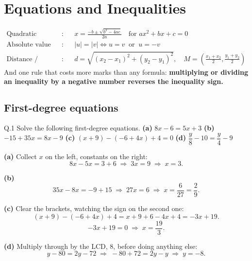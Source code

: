\chapter{Equations and Inequalities}


\begin{keyidea}
\begin{align*}
\text{Quadratic formula}&: && x=\frac{-b\pm\sqrt{b^{2}-4ac}}{2a}
   \quad\text{for } ax^{2}+bx+c=0\\[2pt]
\text{Absolute value}&: && |u|=|v| \iff u=v \ \text{ or } \ u=-v\\[2pt]
\text{Distance / midpoint}&: &&
   d=\sqrt{(x_2-x_1)^{2}+(y_2-y_1)^{2}},\quad
   M=\left(\tfrac{x_1+x_2}{2},\tfrac{y_1+y_2}{2}\right)
\end{align*}
And one rule that costs more marks than any formula: \textbf{multiplying or
dividing an inequality by a negative number reverses the inequality sign.}
\end{keyidea}

\section{First-degree equations}

\begin{question}{Q.1}
Solve the following first-degree equations.
\textbf{(a)} $8x-6=5x+3$ \quad
\textbf{(b)} $-15+35x=8x-9$ \quad
\textbf{(c)} $(x+9)-(-6+4x)+4=0$ \quad
\textbf{(d)} $\dfrac{y}{8}-10=\dfrac{y}{4}-9$
\end{question}

\begin{solution}
\textbf{(a)} Collect $x$ on the left, constants on the right:
\[
8x-5x=3+6 \;\Longrightarrow\; 3x=9 \;\Longrightarrow\; x=3 .
\]

\medskip
\textbf{(b)}
\[
35x-8x=-9+15 \;\Longrightarrow\; 27x=6 \;\Longrightarrow\;
x=\frac{6}{27}=\frac{2}{9}.
\]

\medskip
\textbf{(c)} Clear the brackets, watching the sign on the second one:
\[
(x+9)-(-6+4x)+4 = x+9+6-4x+4 = -3x+19 .
\]
\[
-3x+19=0 \;\Longrightarrow\; x=\frac{19}{3}.
\]

\medskip
\textbf{(d)} Multiply through by the LCD, 8, before doing anything else:
\[
y-80=2y-72 \;\Longrightarrow\; -80+72=2y-y \;\Longrightarrow\; y=-8 .
\]

\end{solution}

